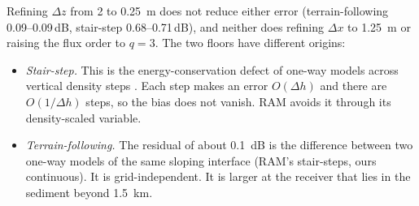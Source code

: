 Refining $\Delta z$ from 2 to \SI{0.25}{m} does not reduce either error
(terrain-following 0.09--0.09\,dB, stair-step
0.68--0.71\,dB), and neither does refining
$\Delta x$ to \SI{1.25}{m} or raising the flux order to $q=3$. The two floors have
different origins:
\begin{itemize}
\item \emph{Stair-step.} This is the energy-conservation defect of one-way models
across vertical density steps \cite{porter1991energy}. Each step makes an error
$O(\Delta h)$ and there are $O(1/\Delta h)$ steps, so the bias does not vanish.
RAM avoids it through its density-scaled variable.
\item \emph{Terrain-following.} The residual of about \SI{0.1}{dB} is the
difference between two one-way models of the same sloping interface (RAM's
stair-steps, ours continuous). It is grid-independent. It is larger at the
receiver that lies in the sediment beyond \SI{1.5}{km}.
\end{itemize}
